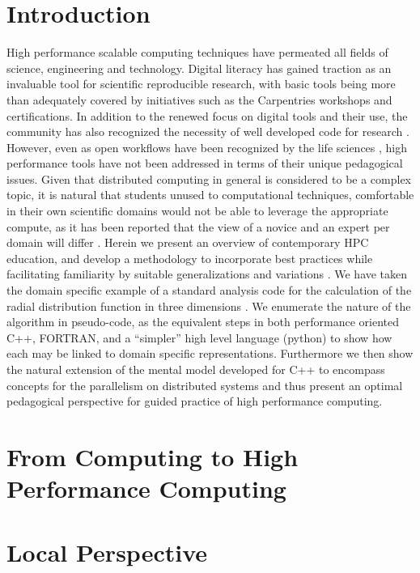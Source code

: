 \documentclass[conference]{IEEEtran}
\begin{document}
\section{Introduction}
High performance scalable computing techniques have permeated all fields of science, engineering and technology. Digital literacy has gained traction as an invaluable tool for scientific reproducible research, with basic tools being more than adequately covered by initiatives such as the Carpentries \cite{wilsonSoftwareCarpentryGetting2006a,tealDataCarpentryWorkshops2015} workshops and certifications. In addition to the renewed focus on digital tools and their use, the community has also recognized the necessity of well developed code for research \cite{gobleBetterSoftwareBetter2014}. However, even as open workflows have been recognized by the life sciences \cite{prlicTenSimpleRules2012,altschulAnatomySuccessfulComputational2013}, high performance tools have not been addressed in terms of their unique pedagogical issues. Given that distributed computing in general is considered to be a complex topic, it is natural that students unused to computational techniques, comfortable in their own scientific domains would not be able to leverage the appropriate compute, as it has been reported that the view of a novice and an expert per domain will differ \cite{chiNatureExpertise1988}. Herein we present an overview of contemporary HPC education, and develop a methodology to incorporate best practices while facilitating familiarity by suitable generalizations and variations \cite{catramboneGeneralizingSolutionProceduresa,braithwaiteEffectsVariationPrior2015}. We have taken the domain specific example of a standard analysis code for the calculation of the radial distribution function in three dimensions \cite{frenkelUnderstandingMolecularSimulation2001}. We enumerate the nature of the algorithm in pseudo-code, as the equivalent steps in both performance oriented C++, FORTRAN, and a ``simpler'' high level language (python) to show how each may be linked to domain specific representations. Furthermore we then show the natural extension of the mental model developed for C++ to encompass concepts for the parallelism on distributed systems and thus present an optimal pedagogical perspective for guided practice \cite{ericssonRoleDeliberatePractice} of high performance computing.
\section{From Computing to High Performance Computing}
\section{Local Perspective}
\printbibliography
\end{document}
